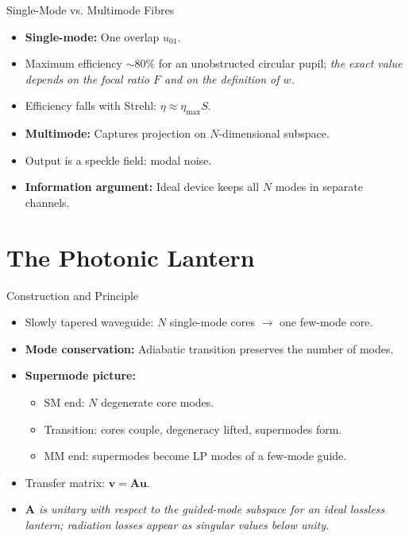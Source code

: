 \documentclass[aspectratio=169,10pt]{beamer}
\begin{document}
\begin{frame}{Single-Mode vs. Multimode Fibres}
\begin{itemize}
    \item \textbf{Single-mode:} One overlap \(u_{01}\).
    \item Maximum efficiency $\sim 80\%$ for an unobstructed circular pupil; \emph{the exact value depends on the focal ratio $F$ and on the definition of $w$.}
    \item Efficiency falls with Strehl: \(\eta \approx \eta_{\max} S\).
    \item \textbf{Multimode:} Captures projection on \(N\)-dimensional subspace.
    \item Output is a speckle field: modal noise.
    \item \textbf{Information argument:} Ideal device keeps all \(N\) modes in separate channels.
\end{itemize}
\end{frame}

\section{The Photonic Lantern}
\begin{frame}{Construction and Principle}
\begin{itemize}
    \item Slowly tapered waveguide: \(N\) single-mode cores \(\to\) one few-mode core.
    \item \textbf{Mode conservation:} Adiabatic transition preserves the number of modes.
    \item \textbf{Supermode picture:}
    \begin{itemize}
        \item SM end: \(N\) degenerate core modes.
        \item Transition: cores couple, degeneracy lifted, supermodes form.
        \item MM end: supermodes become LP modes of a few-mode guide.
    \end{itemize}
    \item Transfer matrix: \(\mathbf{v} = \mathbf{A} \mathbf{u}\).
    \item \emph{\(\mathbf{A}\) is unitary with respect to the guided-mode subspace for an ideal lossless lantern; radiation losses appear as singular values below unity.}
\end{itemize}
\end{frame}
\end{document}
